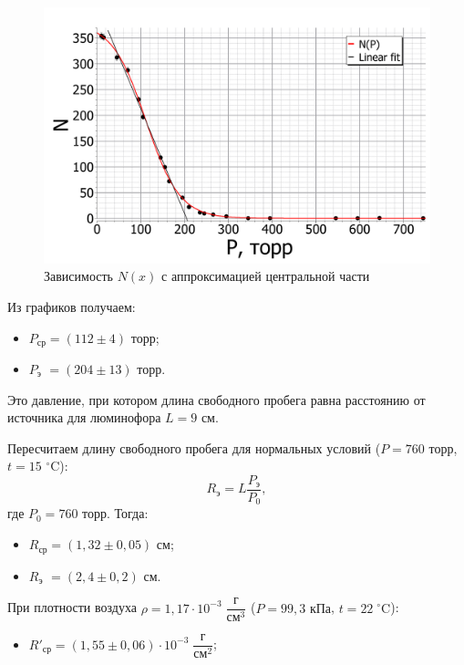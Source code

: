 \begin{enumerate}
		\begin{figure}[h!]
			\centering
			\includegraphics[width=\linewidth]{Pictures/Scintillation_PlotFit.pdf}
			\caption{Зависимость $N(x)$ с аппроксимацией центральной части}
		\end{figure}
	
	
		\newpage
		Из графиков получаем:
		\begin{itemize}
			\item $P_\text{ср} = (112 \pm 4) \text{ торр}$;
			
			
			\item $P_\text{э} \,\, = (204 \pm 13) \text{ торр}$.
		\end{itemize}
	
		Это давление, при котором длина свободного пробега равна расстоянию от источника для люминофора $L = 9$ см. 
		
		Пересчитаем длину свободного пробега для нормальных условий ($P = 760$ торр, $t = 15$ $^\circ$C):
		\begin{equation*}
			R_\text{э} = L\frac{P_\text{э}}{P_0}, 
		\end{equation*}
		\noindent где $P_0 = 760$ торр. Тогда:
		
		\begin{itemize}
			\item $R_\text{ср} = (1,32 \pm 0,05) \text{ см}$;
			
			
			\item $R_\text{э} \,\, = (2,4 \pm 0,2) \text{ см}$.
		\end{itemize}
		
		При плотности воздуха $\rho = 1,17 \cdot 10^{-3} \;\dfrac{\text{г}}{\text{см}^3}$ ($P = 99,3 \text{ кПа}$, $t = 22\;^\circ \text{C}$):
		\begin{itemize}
			\item $R'_\text{ср} = (1,55 \pm 0,06) \cdot 10^{-3} \;\dfrac{\text{г}}{\text{см}^2}$;
			

\end{itemize}
\end{enumerate}
